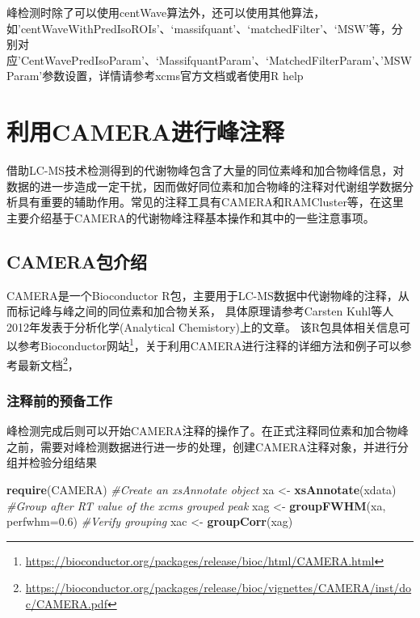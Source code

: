 \documentclass[]{ctexbook}
\newenvironment{Shaded}{\begin{snugshade}}{\end{snugshade}}
\newcommand{\CommentTok}[1]{\textcolor[rgb]{0.56,0.35,0.01}{\textit{#1}}}
\newcommand{\DataTypeTok}[1]{\textcolor[rgb]{0.13,0.29,0.53}{#1}}
\newcommand{\FloatTok}[1]{\textcolor[rgb]{0.00,0.00,0.81}{#1}}
\newcommand{\KeywordTok}[1]{\textcolor[rgb]{0.13,0.29,0.53}{\textbf{#1}}}
\newcommand{\NormalTok}[1]{#1}
\newcommand{\StringTok}[1]{\textcolor[rgb]{0.31,0.60,0.02}{#1}}
\renewcommand{\href}[2]{#2\footnote{\url{#1}}}
\begin{document}
峰检测时除了可以使用centWave算法外，还可以使用其他算法，如'centWaveWithPredIsoROIs'、`massifquant'、`matchedFilter'、`MSW'等，分别对应'CentWavePredIsoParam'、`MassifquantParam'、`MatchedFilterParam'、'MSWParam'参数设置，详情请参考xcms官方文档或者使用R help

\hypertarget{camera}{%
\section{利用CAMERA进行峰注释}\label{camera}}

借助LC-MS技术检测得到的代谢物峰包含了大量的同位素峰和加合物峰信息，对数据的进一步造成一定干扰，因而做好同位素和加合物峰的注释对代谢组学数据分析具有重要的辅助作用。常见的注释工具有CAMERA和RAMCluster等，在这里主要介绍基于CAMERA的代谢物峰注释基本操作和其中的一些注意事项。

\hypertarget{camera}{%
\subsection{CAMERA包介绍}\label{camera}}

CAMERA是一个Bioconductor R包，主要用于LC-MS数据中代谢物峰的注释，从而标记峰与峰之间的同位素和加合物关系，
具体原理请参考Carsten Kuhl等人2012年发表于分析化学(Analytical Chemistory)上的文章\citep{Kuhl:2011fy}。
该R包具体相关信息可以参考\href{https://bioconductor.org/packages/release/bioc/html/CAMERA.html}{Bioconductor网站}，关于利用CAMERA进行注释的详细方法和例子可以参考\href{https://bioconductor.org/packages/release/bioc/vignettes/CAMERA/inst/doc/CAMERA.pdf}{最新文档}，

\subsubsection{注释前的预备工作}

峰检测完成后则可以开始CAMERA注释的操作了。在正式注释同位素和加合物峰之前，需要对峰检测数据进行进一步的处理，创建CAMERA注释对象，并进行分组并检验分组结果

\begin{Shaded}
\begin{Highlighting}[]
\KeywordTok{require}\NormalTok{(CAMERA)}
\CommentTok{#Create an xsAnnotate object}
\NormalTok{xa <-}\StringTok{ }\KeywordTok{xsAnnotate}\NormalTok{(xdata)}
\CommentTok{#Group after RT value of the xcms grouped peak}
\NormalTok{xag <-}\StringTok{ }\KeywordTok{groupFWHM}\NormalTok{(xa, }\DataTypeTok{perfwhm=}\FloatTok{0.6}\NormalTok{)}
\CommentTok{#Verify grouping}
\NormalTok{xac <-}\StringTok{ }\KeywordTok{groupCorr}\NormalTok{(xag)}
\end{Highlighting}
\end{Shaded}
\end{document}
